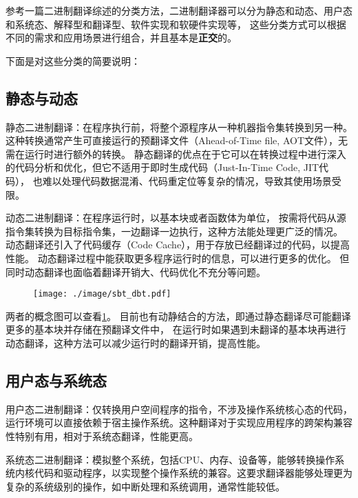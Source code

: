 参考一篇二进制翻译综述的分类方法\cite{BT_review}，二进制翻译器可以分为静态和动态、用户态和系统态、解释型和翻译型、软件实现和软硬件实现等，
这些分类方式可以根据不同的需求和应用场景进行组合，并且基本是\textbf{正交}的。

下面是对这些分类的简要说明：

\subsection{静态与动态}
静态二进制翻译：在程序执行前，将整个源程序从一种机器指令集转换到另一种。
这种转换通常产生可直接运行的预翻译文件（Ahead-of-Time file, AOT文件），无需在运行时进行额外的转换。
静态翻译的优点在于它可以在转换过程中进行深入的代码分析和优化，但它不适用于即时生成代码（Just-In-Time Code, JIT代码），
也难以处理代码数据混淆、代码重定位等复杂的情况，导致其使用场景受限。

动态二进制翻译：在程序运行时，以基本块或者函数体为单位，
按需将代码从源指令集转换为目标指令集，一边翻译一边执行，这种方法能处理更广泛的情况。
动态翻译还引入了代码缓存（Code Cache），用于存放已经翻译过的代码，以提高性能。
动态翻译过程中能获取更多程序运行时的信息，可以进行更多的优化。
但同时动态翻译也面临着翻译开销大、代码优化不充分等问题。

\begin{figure}[!htbp]
  \centering
  \texttt{[image: ./image/sbt\_dbt.pdf]}
  \label{img:sbt_dbt}
\end{figure}

两者的概念图可以查看\ref{img:sbt_dbt}。
目前也有动静结合的方法，即通过静态翻译尽可能翻译更多的基本块并存储在预翻译文件中，
在运行时如果遇到未翻译的基本块再进行动态翻译，这种方法可以减少运行时的翻译开销，提高性能。

\subsection{用户态与系统态}
用户态二进制翻译：仅转换用户空间程序的指令，不涉及操作系统核心态的代码，运行环境可以直接依赖于宿主操作系统。这种翻译对于实现应用程序的跨架构兼容性特别有用，相对于系统态翻译，性能更高。

系统态二进制翻译：模拟整个系统，包括CPU、内存、设备等，能够转换操作系统内核代码和驱动程序，以实现整个操作系统的兼容。这要求翻译器能够处理更为复杂的系统级别的操作，如中断处理和系统调用，通常性能较低。

